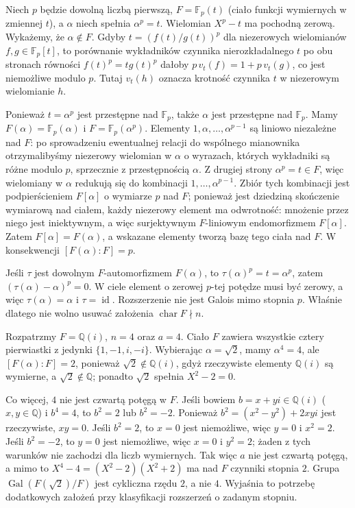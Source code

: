 \begin{przyklad}\label{aa:prz:kummer-inseparable}
Niech $p$ będzie dowolną liczbą pierwszą, $F=\mathbb F_p(t)$
(ciało funkcji wymiernych w zmiennej $t$), a $\alpha$
niech spełnia $\alpha^p=t$. Wielomian $X^p-t$ ma
pochodną zerową. Wykażemy, że $\alpha\notin F$.
Gdyby $t=(f(t)/g(t))^p$ dla niezerowych wielomianów
$f,g\in\mathbb F_p[t]$, to porównanie wykładników czynnika
nierozkładalnego $t$ po obu stronach równości
$f(t)^p=tg(t)^p$ dałoby
$p\,v_t(f)=1+p\,v_t(g)$, co jest niemożliwe modulo $p$.
Tutaj $v_t(h)$ oznacza krotność czynnika $t$ w niezerowym
wielomianie $h$.

Ponieważ $t=\alpha^p$ jest przestępne nad $\mathbb F_p$,
także $\alpha$ jest przestępne nad $\mathbb F_p$. Mamy
$F(\alpha)=\mathbb F_p(\alpha)$ i
$F=\mathbb F_p(\alpha^p)$.
Elementy $1,\alpha,\ldots,\alpha^{p-1}$ są liniowo
niezależne nad $F$: po sprowadzeniu ewentualnej relacji
do wspólnego mianownika otrzymalibyśmy niezerowy
wielomian w $\alpha$ o wyrazach, których wykładniki
są różne modulo $p$, sprzecznie z przestępnością $\alpha$.
Z drugiej strony $\alpha^p=t\in F$, więc
wielomiany w $\alpha$ redukują się do kombinacji
$1,\ldots,\alpha^{p-1}$. Zbiór tych kombinacji jest
podpierścieniem $F[\alpha]$ o wymiarze $p$ nad $F$;
ponieważ jest dziedziną skończenie wymiarową nad ciałem,
każdy niezerowy element ma odwrotność: mnożenie przez
niego jest iniektywnym, a więc surjektywnym
$F$-liniowym endomorfizmem $F[\alpha]$.
Zatem $F[\alpha]=F(\alpha)$, a wskazane elementy
tworzą bazę tego ciała nad $F$. W konsekwencji
$[F(\alpha):F]=p$.

Jeśli $\tau$ jest dowolnym $F$-automorfizmem $F(\alpha)$,
to $\tau(\alpha)^p=t=\alpha^p$, zatem
$(\tau(\alpha)-\alpha)^p=0$. W ciele element
o zerowej $p$-tej potędze musi być zerowy,
a więc $\tau(\alpha)=\alpha$ i $\tau=\operatorname{id}$.
Rozszerzenie nie jest Galois mimo stopnia $p$.
Właśnie dlatego nie wolno usuwać założenia
$\operatorname{char}F\nmid n$.
\end{przyklad}

\begin{przyklad}
Rozpatrzmy $F=\mathbb Q(i)$, $n=4$ oraz $a=4$.
Ciało $F$ zawiera wszystkie cztery pierwiastki z jedynki
$\{1,-1,i,-i\}$. Wybierając $\alpha=\sqrt2$, mamy
$\alpha^4=4$, ale $[F(\alpha):F]=2$, ponieważ
$\sqrt2\notin\mathbb Q(i)$, gdyż rzeczywiste elementy $\mathbb Q(i)$
są wymierne, a $\sqrt2\notin\mathbb Q$; ponadto $\sqrt2$
spełnia $X^2-2=0$.

Co więcej, $4$ nie jest czwartą potęgą w $F$.
Jeśli bowiem $b=x+yi\in\mathbb Q(i)$ ($x,y\in\mathbb Q$)
i $b^4=4$, to $b^2=2$ lub $b^2=-2$.
Ponieważ $b^2=(x^2-y^2)+2xyi$ jest rzeczywiste,
$xy=0$. Jeśli $b^2=2$, to $x=0$ jest niemożliwe,
więc $y=0$ i $x^2=2$. Jeśli $b^2=-2$, to $y=0$
jest niemożliwe, więc $x=0$ i $y^2=2$;
żaden z tych warunków nie zachodzi dla liczb wymiernych.
Tak więc $a$ nie jest czwartą potęgą, a mimo to
$X^4-4=(X^2-2)(X^2+2)$ ma nad $F$ czynniki stopnia $2$.
Grupa $\operatorname{Gal}(F(\sqrt2)/F)$ jest cykliczna
rzędu $2$, a nie $4$. Wyjaśnia to potrzebę dodatkowych
założeń przy klasyfikacji rozszerzeń o zadanym stopniu.
\end{przyklad}

